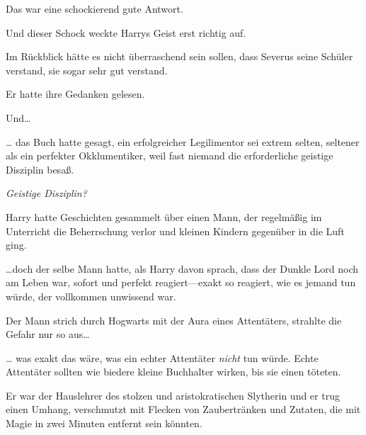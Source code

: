 Das war eine schockierend gute Antwort.

Und dieser Schock weckte Harrys Geist erst richtig auf.

Im Rückblick hätte es nicht überraschend sein sollen, dass Severus seine Schüler verstand, sie sogar sehr gut verstand.

Er hatte ihre Gedanken gelesen.

Und…

… das Buch hatte gesagt, ein erfolgreicher Legilimentor sei extrem selten, seltener als ein perfekter Okklumentiker, weil fast niemand die erforderliche geistige Disziplin besaß.

\emph{Geistige Disziplin?}

Harry hatte Geschichten gesammelt über einen Mann, der regelmäßig im Unterricht die Beherrschung verlor und kleinen Kindern gegenüber in die Luft ging.

…doch der selbe Mann hatte, als Harry davon sprach, dass der Dunkle Lord noch am Leben war, sofort und perfekt reagiert—exakt so reagiert, wie es jemand tun würde, der vollkommen unwissend war.

Der Mann strich durch Hogwarts mit der Aura eines Attentäters, strahlte die Gefahr nur so aus…

… was exakt das wäre, was ein echter Attentäter \emph{nicht} tun würde. Echte Attentäter sollten wie biedere kleine Buchhalter wirken, bis sie einen töteten.

Er war der Hauslehrer des stolzen und aristokratischen Slytherin und er trug einen Umhang, verschmutzt mit Flecken von Zaubertränken und Zutaten, die mit Magie in zwei Minuten entfernt sein könnten.

